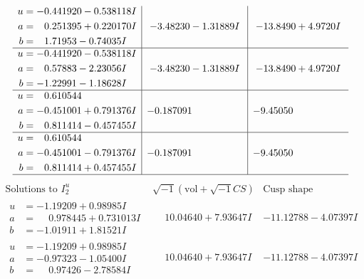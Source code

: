 \documentclass[1p]{elsarticle_modified}
\theoremstyle{definition}
\newcommand{\I}{\sqrt{-1}}
\begin{document}
$$\begin{array}{c|c|c}
\begin{aligned}
u &= -0.441920 - 0.538118 I \\
a &= \phantom{-}0.251395 + 0.220170 I \\
b &= \phantom{-}1.71953 - 0.74035 I\end{aligned}
 & -3.48230 - 1.31889 I & -13.8490 + 4.9720 I \\ \hline\begin{aligned}
u &= -0.441920 - 0.538118 I \\
a &= \phantom{-}0.57883 - 2.23056 I \\
b &= -1.22991 - 1.18628 I\end{aligned}
 & -3.48230 - 1.31889 I & -13.8490 + 4.9720 I \\ \hline\begin{aligned}
u &= \phantom{-}0.610544\phantom{ +0.000000I} \\
a &= -0.451001 + 0.791376 I \\
b &= \phantom{-}0.811414 - 0.457455 I\end{aligned}
 & -0.187091\phantom{ +0.000000I} & -9.45050\phantom{ +0.000000I} \\ \hline\begin{aligned}
u &= \phantom{-}0.610544\phantom{ +0.000000I} \\
a &= -0.451001 - 0.791376 I \\
b &= \phantom{-}0.811414 + 0.457455 I\end{aligned}
 & -0.187091\phantom{ +0.000000I} & -9.45050\phantom{ +0.000000I}\\
 \hline 
 \end{array}$$\newpage$$\begin{array}{c|c|c}  
\text{Solutions to }I^u_{2}& \I (\text{vol} + \sqrt{-1}CS) & \text{Cusp shape}\\
 \hline 
\begin{aligned}
u &= -1.19209 + 0.98985 I \\
a &= \phantom{-}0.978445 + 0.731013 I \\
b &= -1.01911 + 1.81521 I\end{aligned}
 & \phantom{-}10.04640 + 7.93647 I & -11.12788 - 4.07397 I \\ \hline\begin{aligned}
u &= -1.19209 + 0.98985 I \\
a &= -0.97323 - 1.05400 I \\
b &= \phantom{-}0.97426 - 2.78584 I\end{aligned}
 & \phantom{-}10.04640 + 7.93647 I & -11.12788 - 4.07397 I \\ \hline\begin{aligned}

\end{aligned}
\end{array}$$
\end{document}
